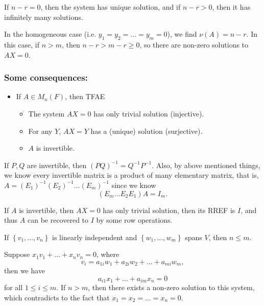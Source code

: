 \begin{note}
    If \(n - r = 0\), then the system has unique solution, and if \(n - r > 0\), then it has infinitely many solutions.  
\end{note}

In the homogeneous case (i.e. \(y_1 = y_2 = \dots = y_m = 0\)), we find \(\nu (A) = n - r\). In this case, if \(n > m\), then \(n - r > m - r \ge 0\), so there are non-zero solutions to \(AX = 0\). 

\subsubsection{Some consequences: }
\begin{itemize}
    \item If \(A \in M_n(F)\), then TFAE 
    \begin{itemize}
        \item The system \(AX=0\) has only trivial solution (injective). 
        \item For any \(Y\), \(AX=Y\) has a (unique) solution (surjective). 
        \item \(A\) is invertible.     
    \end{itemize}
\end{itemize}

If \(P, Q\) are invertible, then \((PQ)^{-1} = Q^{-1} P^{-1}   \). Also, by above mentioned things, we know every invertible matrix is a product of many elementary matrix, that is, \(A = (E_1)^{-1} (E_2)^{-1} \dots (E_m)^{-1}\) since we know 
\[
    (E_m \dots E_2 E_1)A = I_m.
\]   
\begin{note}
    If \(A\) is invertible, then \(AX = 0\) has only trivial solution, then its RREF is \(I\), and thus \(A\) can be recovered to \(I\) by some row operations.    
\end{note}

\begin{prev}
    If \(\left\{ v_1, \dots , v_n \right\} \) is linearly independent and \(\left\{ w_1, \dots , w_m \right\} \) spans \(V\), then \(n \le m\).     
\end{prev}

Suppose \(x_1 v_1 + \dots + x_n v_n = 0\), where 
\[
    v_i = a_{1i}w_1 + a_{2i}w_2 + \dots + a_{mi} w_m,
\] then we have 
\[
    a_{i1} x_1 + \dots + a_{im} x_n = 0
\] for all \(1 \le i \le m\). If \(n > m\), then there exists a non-zero solution to this system, which contradicts to the fact that \(x_1 = x_2 = \dots = x_n = 0\).  

